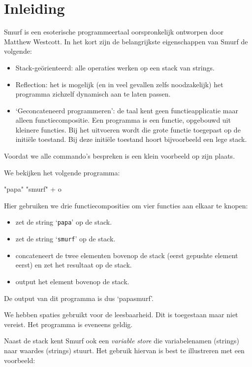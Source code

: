 \section{Inleiding}
\label{sec:intro}

Smurf is een esoterische programmeertaal oorspronkelijk ontworpen door Matthew
Westcott. In het kort zijn de belangrijkste eigenschappen van Smurf de
volgende:
\begin{itemize}
	\item Stack-geörienteerd: alle operaties werken op een stack van strings.
	\item Reflection: het is mogelijk (en in veel gevallen zelfs noodzakelijk)
		het programma zichzelf dynamisch aan te laten passen.
	\item `Geconcateneerd programmeren': de taal kent geen functieapplicatie maar
		alleen functiecompositie. Een programma is een functie, opgebouwd uit
		kleinere functies. Bij het uitvoeren wordt die grote functie toegepast op
		de initiële toestand. Bij deze initiële toestand hoort bijvoorbeeld een
		lege stack.
\end{itemize}
Voordat we alle commando's bespreken is een klein voorbeeld op zijn plaats.

\begin{exmp}
	We bekijken het volgende programma:
	\begin{smurf}"papa" "smurf" + o\end{smurf}
	Hier gebruiken we drie functiecomposities om vier functies aan elkaar te
	knopen:
	\begin{itemize}
		\item {} zet de string `\texttt{papa}' op de stack.
		\item {} zet de string `\texttt{smurf}' op de stack.
		\item \smurfinline{+} concateneert de twee elementen bovenop de stack
			(eerst gepushte element eerst) en zet het resultaat op de stack.
		\item {} output het element bovenop de stack.
	\end{itemize}
	De output van dit programma is dus `papasmurf'.

	We hebben spaties gebruikt voor de leesbaarheid. Dit is toegestaan maar niet
	vereist. Het programma  is eveneens geldig.
\end{exmp}

Naast de stack kent Smurf ook een \emph{variable store} die variabelenamen
(strings) naar waardes (strings) stuurt. Het gebruik hiervan is best te
illustreren met een voorbeeld:

